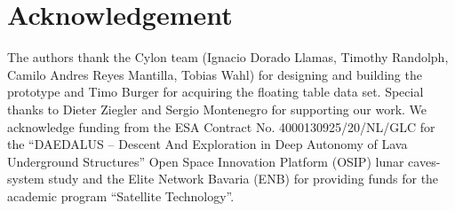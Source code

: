 \section*{Acknowledgement}
The authors thank the Cylon team (Ignacio Dorado Llamas, Timothy Randolph, Camilo Andres Reyes Mantilla, Tobias Wahl) for designing and building the prototype and Timo Burger for acquiring the floating table data set.
Special thanks to Dieter Ziegler and Sergio Montenegro for supporting our work.
We acknowledge funding from the ESA Contract No. 4000130925/20/NL/GLC for the ``DAEDALUS -- Descent And Exploration in Deep Autonomy of Lava Underground Structures'' Open Space Innovation Platform (OSIP) lunar caves-system study and the Elite Network Bavaria (ENB) for providing funds for the academic program ``Satellite Technology''.
